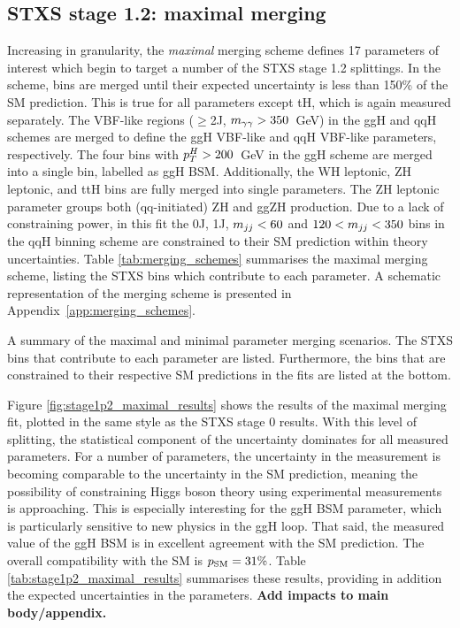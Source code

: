 \subsection{STXS stage 1.2: maximal merging}
Increasing in granularity, the \textit{maximal} merging scheme defines 17 parameters of interest which begin to target a number of the STXS stage 1.2 splittings. In the scheme, bins are merged until their expected uncertainty is less than 150\% of the SM prediction. This is true for all parameters except tH, which is again measured separately. The VBF-like regions ($\geq$2J, $m_{\gamma\gamma}>350$~GeV) in the ggH and qqH schemes are merged to define the ggH VBF-like and qqH VBF-like parameters, respectively. The four bins with $p_T^H>200$~GeV in the ggH scheme are merged into a single bin, labelled as ggH BSM. Additionally, the WH leptonic, ZH leptonic, and ttH bins are fully merged into single parameters. The ZH leptonic parameter groups both (qq-initiated) ZH and ggZH production. Due to a lack of constraining power, in this fit the 0J, 1J, $m_{jj}<60$ and $120<m_{jj}<350$ bins in the qqH binning scheme are constrained to their SM prediction within theory uncertainties. Table \ref{tab:merging_schemes} summarises the maximal merging scheme, listing the STXS bins which contribute to each parameter. A schematic representation of the merging scheme is presented in Appendix~\ref{app:merging_schemes}.

\begin{table}[htbp]
  \centering
  \scriptsize
  \renewcommand{\arraystretch}{1.2}
  \setlength{\tabcolsep}{2.2pt}
  \caption{
    A summary of the maximal and minimal parameter merging scenarios. 
    The STXS bins that contribute to each parameter are listed. 
    Furthermore, the bins that are constrained to their respective SM predictions 
    in the fits are listed at the bottom.
  }
  \label{tab:merging_schemes}
  \hspace*{-1cm}
  
  \hspace*{-1cm}
\end{table}

Figure \ref{fig:stage1p2_maximal_results} shows the results of the maximal merging fit, plotted in the same style as the STXS stage 0 results. With this level of splitting, the statistical component of the uncertainty dominates for all measured parameters. For a number of parameters, the uncertainty in the measurement is becoming comparable to the uncertainty in the SM prediction, meaning the possibility of constraining Higgs boson theory using experimental measurements is approaching. This is especially interesting for the ggH BSM parameter, which is particularly sensitive to new physics in the ggH loop. That said, the measured value of the ggH BSM \xsbr is in excellent agreement with the SM prediction. The overall compatibility with the SM is $p_{\rm{SM}}=31\%$. Table \ref{tab:stage1p2_maximal_results} summarises these results, providing in addition the expected uncertainties in the parameters. \textbf{Add impacts to main body/appendix.}


